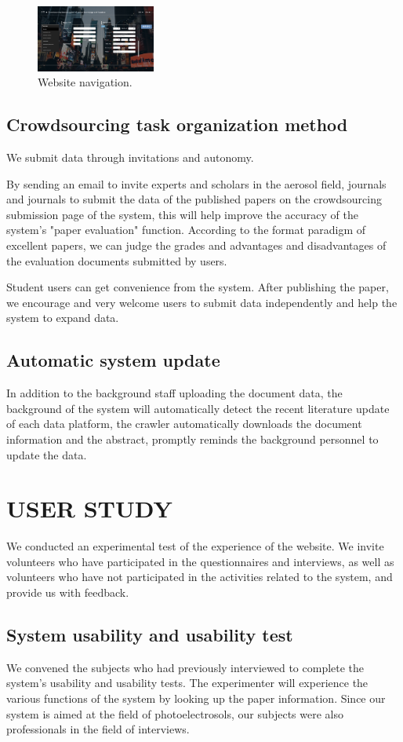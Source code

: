 \begin{figure}
	\includegraphics[width=0.35\textwidth]{figures/pic7.png}
	\caption{Website navigation.}
\end{figure}

\subsection{Crowdsourcing task organization method}
We submit data through invitations and autonomy.

By sending an email to invite experts and scholars in the aerosol field, journals and journals to submit the data of the published papers on the crowdsourcing submission page of the system, this will help improve the accuracy of the system's "paper evaluation" function. According to the format paradigm of excellent papers, we can judge the grades and advantages and disadvantages of the evaluation documents submitted by users.

Student users can get convenience from the system. After publishing the paper, we encourage and very welcome users to submit data independently and help the system to expand data.

\subsection{Automatic system update}
In addition to the background staff uploading the document data, the background of the system will automatically detect the recent literature update of each data platform, the crawler automatically downloads the document information and the abstract, promptly reminds the background personnel to update the data.

\section{USER STUDY}
We conducted an experimental test of the experience of the website. We invite volunteers who have participated in the questionnaires and interviews, as well as volunteers who have not participated in the activities related to the system, and provide us with feedback.

\subsection{System usability and usability test}
We convened the subjects who had previously interviewed to complete the system's usability and usability tests. The experimenter will experience the various functions of the system by looking up the paper information. Since our system is aimed at the field of photoelectrosols, our subjects were also professionals in the field of interviews.

